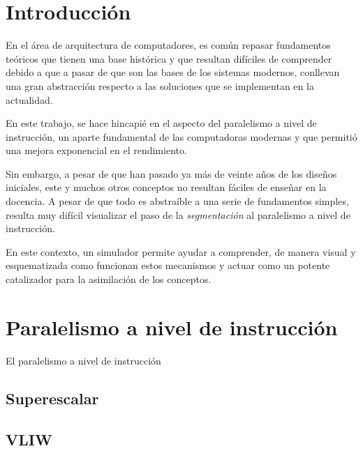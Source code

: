 
\section{Introducción}
\label{1:sec:1}

En el área de arquitectura de computadores, es común repasar fundamentos teóricos
que tienen una base histórica y que resultan difíciles de comprender debido 
a que a pasar de que son las bases de los sistemas modernos, conllevan 
una gran abstracción respecto a las soluciones que se implementan en la actualidad.

\bigskip
En este trabajo, se hace hincapié en el aspecto del paralelismo a nivel de instrucción, 
un aparte fundamental de las computadoras modernas y que permitió una mejora exponencial
en el rendimiento.

\bigskip
Sin embargo, a pesar de que han pasado ya más de veinte años de los diseños iniciales,
este y muchos otros conceptos no resultan fáciles de enseñar en la docencia. A pesar de que 
todo es abstraíble a una serie de fundamentos simples, resulta muy difícil visualizar el 
paso de la \textit{segmentación} al paralelismo a nivel de instrucción.

\bigskip
En este contexto, un simulador permite ayudar a comprender, de manera visual y esquematizada
como funcionan estos mecanismos y actuar como un potente catalizador para la asimilación de los 
conceptos.


\section{Paralelismo a nivel de instrucción}
\label{1:sec:2}

El paralelismo a nivel de instrucción 

\subsection{Superescalar}


\subsection{VLIW}

